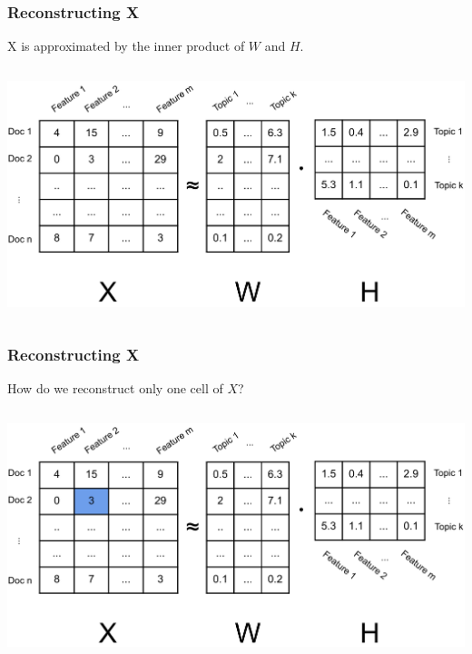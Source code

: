 \documentclass{beamer}
\begin{document}
\begin{frame}
  \frametitle{Reconstructing X}
  X is approximated by the inner product of $W$ and $H$. \vspace{4mm}
  \begin{columns}
    \includegraphics[width=\textwidth]{images/x_w_h.png}
  \end{columns} \vspace{4mm}
\end{frame}

\begin{frame}
  \frametitle{Reconstructing X}
  How do we reconstruct only one cell of $X$? \vspace{4mm}
  \begin{columns}
    \includegraphics[width=\textwidth]{images/x_w_h_cell.png}
  \end{columns} \vspace{4mm}
\end{frame}
\end{document}
